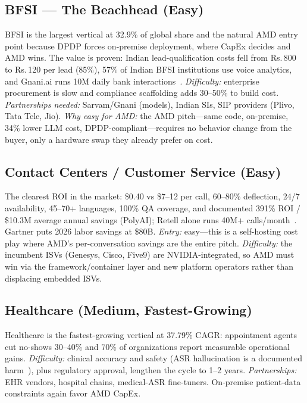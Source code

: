 \documentclass[blind]{gtac}
\providecommand{\rupee}{\ensuremath{\text{\rm\textsf{R}}}} %
\renewcommand{\rupee}{Rs.\,} %
\begin{document}
\subsection{BFSI --- The Beachhead (Easy)}
BFSI is the largest vertical at 32.9\% of global share and the natural AMD entry point because DPDP forces on-premise deployment, where CapEx decides and AMD wins. The value is proven: Indian lead-qualification costs fell from \rupee 800 to \rupee 120 per lead (85\%), 57\% of Indian BFSI institutions use voice analytics, and Gnani.ai runs 10M daily bank interactions~\cite{india_guide}. \emph{Difficulty:} enterprise procurement is slow and compliance scaffolding adds 30--50\% to build cost. \emph{Partnerships needed:} Sarvam/Gnani (models), Indian SIs, SIP providers (Plivo, Tata Tele, Jio). \emph{Why easy for AMD:} the AMD pitch---same code, on-premise, 34\% lower LLM cost, DPDP-compliant---requires no behavior change from the buyer, only a hardware swap they already prefer on cost.

\subsection{Contact Centers / Customer Service (Easy)}
The clearest ROI in the market: \$0.40 vs \$7--12 per call, 60--80\% deflection, 24/7 availability, 45--70+ languages, 100\% QA coverage, and documented 391\% ROI / \$10.3M average annual savings (PolyAI); Retell alone runs 40M+ calls/month~\cite{assemblyai_2026}. Gartner puts 2026 labor savings at \$80B. \emph{Entry:} easy---this is a self-hosting cost play where AMD's per-conversation savings are the entire pitch. \emph{Difficulty:} the incumbent ISVs (Genesys, Cisco, Five9) are NVIDIA-integrated, so AMD must win via the framework/container layer and new platform operators rather than displacing embedded ISVs.

\subsection{Healthcare (Medium, Fastest-Growing)}
Healthcare is the fastest-growing vertical at 37.79\% CAGR: appointment agents cut no-shows 30--40\% and 70\% of organizations report measurable operational gains. \emph{Difficulty:} clinical accuracy and safety (ASR hallucination is a documented harm~\cite{facct_whisper}), plus regulatory approval, lengthen the cycle to 1--2 years. \emph{Partnerships:} EHR vendors, hospital chains, medical-ASR fine-tuners. On-premise patient-data constraints again favor AMD CapEx.
\end{document}

